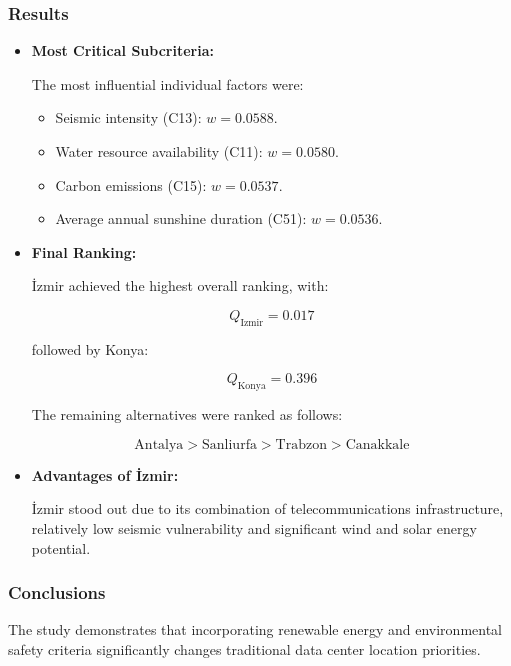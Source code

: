 \subsubsection{Results}

\begin{itemize}

    \item \textbf{Most Critical Subcriteria:}

    The most influential individual factors were:

    \begin{itemize}
        \item Seismic intensity (C13): $w = 0.0588$.
        \item Water resource availability (C11): $w = 0.0580$.
        \item Carbon emissions (C15): $w = 0.0537$.
        \item Average annual sunshine duration (C51): $w = 0.0536$.
    \end{itemize}

    \item \textbf{Final Ranking:}

    İzmir achieved the highest overall ranking, with:

    \[
        Q_{\mathrm{Izmir}} = 0.017
    \]

    followed by Konya:

    \[
        Q_{\mathrm{Konya}} = 0.396
    \]

    The remaining alternatives were ranked as follows:

    \[
    \text{Antalya}
    >
    \text{Sanliurfa}
    >
    \text{Trabzon}
    >
    \text{Canakkale}
    \]

    \item \textbf{Advantages of İzmir:}

    İzmir stood out due to its combination of telecommunications infrastructure, relatively low seismic vulnerability and significant wind and solar energy potential.

\end{itemize}

\subsubsection{Conclusions}

The study demonstrates that incorporating renewable energy and environmental safety criteria significantly changes traditional data center location priorities.

